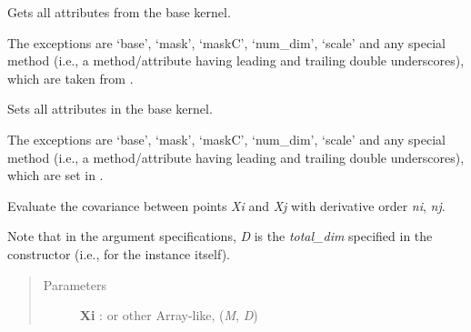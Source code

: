 \documentclass[letterpaper,10pt,english]{sphinxmanual}
\begin{document}
\begin{fulllineitems}
\begin{quote}
\begin{description}
\end{description}\end{quote}

\begin{fulllineitems}
\label{gptools.kernel:gptools.kernel.core.MaskedKernel.__getattribute__}
Gets all attributes from the base kernel.

The exceptions are `base', `mask', `maskC', `num\_dim', `scale' and any
special method (i.e., a method/attribute having leading and trailing
double underscores), which are taken from {\hyperref[gptools.kernel:gptools.kernel.core.MaskedKernel]{}}.

\end{fulllineitems}


\begin{fulllineitems}
\label{gptools.kernel:gptools.kernel.core.MaskedKernel.__setattr__}
Sets all attributes in the base kernel.

The exceptions are `base', `mask', `maskC', `num\_dim', `scale' and any
special method (i.e., a method/attribute having leading and trailing
double underscores), which are set in {\hyperref[gptools.kernel:gptools.kernel.core.MaskedKernel]{}}.

\end{fulllineitems}


\begin{fulllineitems}
\label{gptools.kernel:gptools.kernel.core.MaskedKernel.__call__}
Evaluate the covariance between points \emph{Xi} and \emph{Xj} with derivative order \emph{ni}, \emph{nj}.

Note that in the argument specifications, \emph{D} is the \emph{total\_dim}
specified in the constructor (i.e.,  for the
{\hyperref[gptools.kernel:gptools.kernel.core.MaskedKernel]{}} instance itself).
\begin{quote}\begin{description}
\item[{Parameters}] \leavevmode
\textbf{Xi} :  or other Array-like, (\emph{M}, \emph{D})
\begin{quote}


\end{quote}
\end{description}
\end{quote}
\end{fulllineitems}
\end{fulllineitems}
\end{document}
